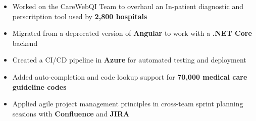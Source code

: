 \begin{itemize}
    \item Worked on the CareWebQI Team to overhaul an In-patient diagnostic and perscritption tool used by \textbf{2,800 hospitals}
    \item Migrated from a deprecated version of \textbf{Angular} to work with a \textbf{.NET Core} backend
    \item Created a CI/CD pipeline in \textbf{Azure} for automated testing and deployment
    \item Added auto-completion and code lookup support for \textbf{70,000 medical care guideline codes}
    \item Applied agile project management principles in cross-team sprint planning sessions with \textbf{Confluence} and \textbf{JIRA}
\end{itemize}